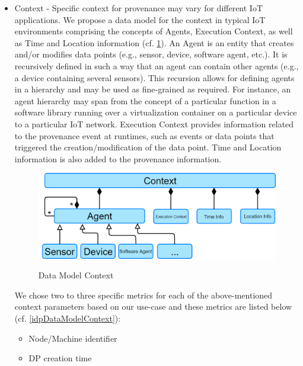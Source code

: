 \begin{itemize}
	\begin{itemize}			
			\item Example: 
\begin{lstlisting}			
[{
    "average": [   // Contribution type
        "5a81c07800031ddaf123",
        "5a81c093000a1d341fab"
    ]
}]		
\end{lstlisting}
	\end{itemize}
	\item Context - Specific context for provenance may vary for different IoT applications. We propose a data model for the context in typical IoT environments comprising the concepts of Agents, Execution Context, as well as Time and Location information (cf. \ref{dataModelContext}). An Agent is an entity that creates and/or modifies data points (e.g., sensor, device,  software agent, etc.). It is recursively defined in such a way that an agent can contain other agents (e.g., a device containing several sensors). This recursion allows for defining agents in a hierarchy and may be used as fine-grained as required. For instance, an agent hierarchy may span from the concept of a particular function in a software library running over a virtualization container on a particular device to a particular IoT network. Execution Context provides information related to the provenance event at runtimes, such as events or data points that triggered the creation/modification of the data point. Time and Location information is also added to the provenance information.
\begin{figure}[h]
\centering
\includegraphics[width=\linewidth]{figures/context.png}\\
\caption{Data Model Context}
\label{dataModelContext}
\end{figure}
We chose two to three specific metrics for each of the above-mentioned context parameters based on our use-case and these metrics are listed below  (cf. \ref{idpDataModelContext}):
		\begin{itemize}
			\item Node/Machine  identifier
			\item DP creation time

\end{itemize}
\end{itemize}
